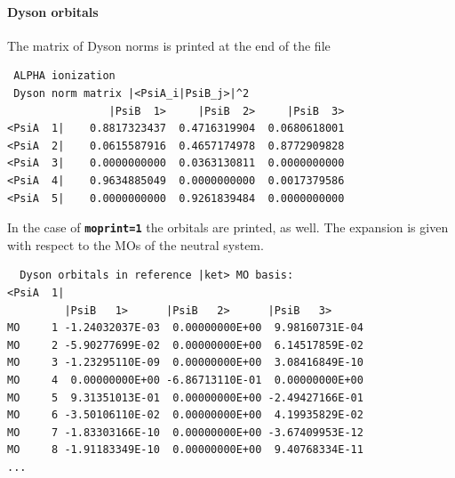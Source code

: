 \documentclass[a4paper,10pt,DIV=15,openany,twoside=false]{scrbook}
\newcommand{\ttt}[1]{\textbf{\texttt{#1}}}
\newenvironment{example}{
  \setlength{\OuterFrameSep}{3pt}
  \vspace{0mm}
  \definecolor{shadecolor}{HTML}{E4F4FF}
  \begin{shaded}
}{
  \end{shaded}
}
\begin{document}
\paragraph{Dyson orbitals}
The matrix of Dyson norms is printed at the end of the file

\begin{example}
\begin{verbatim}
 ALPHA ionization
 Dyson norm matrix |<PsiA_i|PsiB_j>|^2                                          
                |PsiB  1>     |PsiB  2>     |PsiB  3>                           
<PsiA  1|    0.8817323437  0.4716319904  0.0680618001                           
<PsiA  2|    0.0615587916  0.4657174978  0.8772909828                           
<PsiA  3|    0.0000000000  0.0363130811  0.0000000000                           
<PsiA  4|    0.9634885049  0.0000000000  0.0017379586                           
<PsiA  5|    0.0000000000  0.9261839484  0.0000000000 
\end{verbatim}
\end{example}

In the case of \ttt{moprint=1} the orbitals are printed, as well.
The expansion is given with respect to the MOs of the neutral system.
%
\begin{example}
\begin{verbatim}
  Dyson orbitals in reference |ket> MO basis:                                   
<PsiA  1|                                                                       
         |PsiB   1>      |PsiB   2>      |PsiB   3>                             
MO     1 -1.24032037E-03  0.00000000E+00  9.98160731E-04                        
MO     2 -5.90277699E-02  0.00000000E+00  6.14517859E-02                        
MO     3 -1.23295110E-09  0.00000000E+00  3.08416849E-10                        
MO     4  0.00000000E+00 -6.86713110E-01  0.00000000E+00                        
MO     5  9.31351013E-01  0.00000000E+00 -2.49427166E-01                        
MO     6 -3.50106110E-02  0.00000000E+00  4.19935829E-02
MO     7 -1.83303166E-10  0.00000000E+00 -3.67409953E-12                        
MO     8 -1.91183349E-10  0.00000000E+00  9.40768334E-11 
...
\end{verbatim}
\end{example}
%
\end{document}
